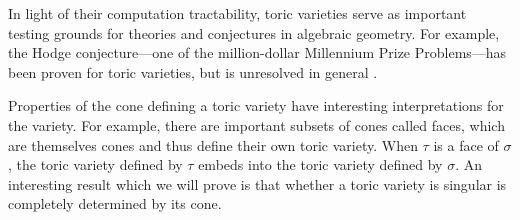 \documentclass[12pt]{amsart}
\theoremstyle{plain}
\theoremstyle{definition}
\begin{document}
In light of their computation tractability, toric varieties serve as important testing grounds for theories and conjectures in algebraic geometry.
For example, the Hodge conjecture---one of the million-dollar Millennium Prize Problems---has been proven for toric varieties, but is unresolved in general \cite{BM21}.

Properties of the cone defining a toric variety have interesting interpretations for the variety.
For example, there are important subsets of cones called faces, which are themselves cones and thus define their own toric variety.
When $\tau$ is a face of $\sigma$, the toric variety defined by $\tau$ embeds into the toric variety defined by $\sigma$.
An interesting result which we will prove is that whether a toric variety is singular is completely determined by its cone.
\end{document}
